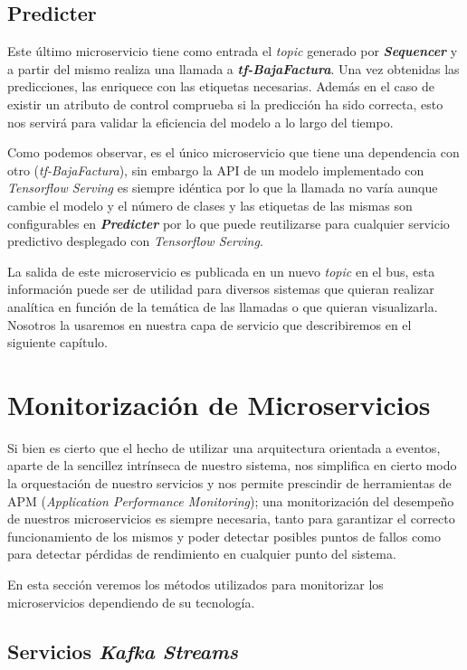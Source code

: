\subsection{Predicter}
Este último microservicio tiene como entrada el \textit{topic} generado por \textit{\textbf{Sequencer}} y a partir del mismo realiza una llamada a \textit{\textbf{tf-BajaFactura}}. Una vez obtenidas las predicciones, las enriquece con las etiquetas necesarias. Además en el caso de existir un atributo de control comprueba si la predicción ha sido correcta, esto nos servirá para validar la eficiencia del modelo a lo largo del tiempo. 

Como podemos observar, es el único microservicio que tiene una dependencia con otro (\textit{tf-BajaFactura}), sin embargo la API de un modelo implementado con \textit{Tensorflow Serving}\cite{serving} es siempre idéntica por lo que la llamada no varía aunque cambie el modelo y el número de clases y las etiquetas de las mismas son configurables en \textit{\textbf{Predicter}} por lo que puede reutilizarse para cualquier servicio predictivo desplegado con  \textit{Tensorflow Serving}.

La salida de este microservicio es publicada en un nuevo \textit{topic} en el bus, esta información puede ser de utilidad para diversos sistemas que quieran realizar analítica en función de la temática de las llamadas o que quieran visualizarla. Nosotros la usaremos en nuestra capa de servicio que describiremos en el siguiente capítulo.


\section{Monitorización de Microservicios}

Si bien es cierto que el hecho de utilizar una arquitectura orientada a eventos, aparte de la sencillez intrínseca de nuestro sistema, nos simplifica en cierto modo la orquestación de nuestro servicios y nos permite prescindir de herramientas de APM (\textit{Application Performance Monitoring}); una monitorización del desempeño de nuestros microservicios es siempre necesaria, tanto para garantizar el correcto funcionamiento de los mismos y poder detectar posibles puntos de fallos como para detectar pérdidas de rendimiento en cualquier punto del sistema. 

En esta sección veremos los métodos utilizados para monitorizar los microservicios dependiendo de su tecnología. 


\subsection{Servicios \textit{Kafka Streams}}

